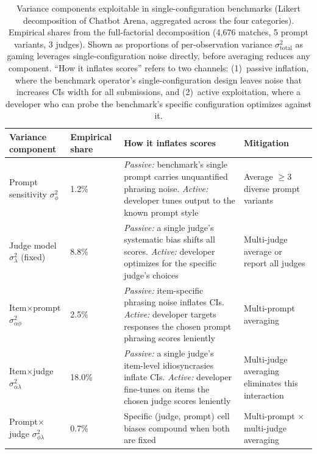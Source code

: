 \begin{table}[ht]
\centering
\caption{Variance components exploitable in single-configuration benchmarks (Likert decomposition of Chatbot Arena, aggregated across the four categories). Empirical shares from the full-factorial decomposition (4,676 matches, 5 prompt variants, 3 judges). Shown as proportions of per-observation variance $\sigma^2_\text{total}$ as gaming leverages single-configuration noise directly, before averaging reduces any component. ``How it inflates scores'' refers to two channels: (1)~passive inflation, where the benchmark operator's single-configuration design leaves noise that increases CIs width for all submissions, and (2)~active exploitation, where a developer who can probe the benchmark's specific configuration optimizes against it.}
\label{tab:gaming}
\small
\begin{tabular}{p{2.6cm}p{1.4cm}p{4.2cm}p{3.9cm}}
\toprule
\textbf{Variance component} & \textbf{Empirical share} & \textbf{How it inflates scores} & \textbf{Mitigation} \\
\midrule
Prompt sensitivity $\sigma^2_\phi$ & 1.2\% & \textit{Passive:} benchmark's single prompt carries unquantified phrasing noise. \textit{Active:} developer tunes output to the known prompt style & Average $\geq$3 diverse prompt variants \\
Judge model $\sigma^2_\lambda$ (fixed) & 8.8\% & \textit{Passive:} a single judge's systematic bias shifts all scores. \textit{Active:} developer optimizes for the specific judge's choices & Multi-judge average or report all judges \\
Item$\times$prompt $\sigma^2_{\alpha\phi}$ & 2.5\% & \textit{Passive:} item-specific phrasing noise inflates CIs. \textit{Active:} developer targets responses the chosen prompt phrasing scores leniently & Multi-prompt averaging \\
Item$\times$judge $\sigma^2_{\alpha\lambda}$ & 18.0\% & \textit{Passive:} a single judge's item-level idiosyncrasies inflate CIs. \textit{Active:} developer fine-tunes on items the chosen judge scores leniently & Multi-judge averaging eliminates this interaction \\
Prompt$\times$judge $\sigma^2_{\phi\lambda}$ & 0.7\% & Specific (judge, prompt) cell biases compound when both are fixed & Multi-prompt $\times$ multi-judge averaging \\
\bottomrule
\end{tabular}
\end{table}


